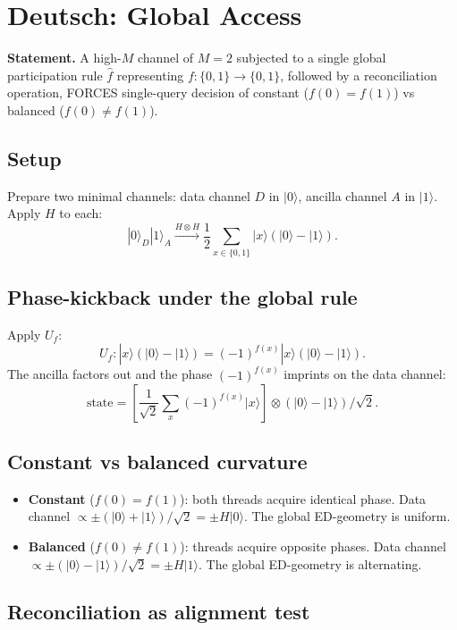 \documentclass[11pt,a4paper]{article}
\begin{document}
\section{Deutsch: Global Access}

\textbf{Statement.} A high-$M$ channel of $M = 2$ subjected to a single global participation rule $\hat f$ representing $f: \{0,1\} \to \{0,1\}$, followed by a reconciliation operation, FORCES single-query decision of constant ($f(0) = f(1)$) vs balanced ($f(0) \neq f(1)$).

\subsection{Setup}

Prepare two minimal channels: data channel $D$ in $|0\rangle$, ancilla channel $A$ in $|1\rangle$. Apply $H$ to each:
\[
|0\rangle_D |1\rangle_A \xrightarrow{H \otimes H} \frac{1}{2}\sum_{x \in \{0,1\}}|x\rangle(|0\rangle - |1\rangle).
\]

\subsection{Phase-kickback under the global rule}

Apply $U_f$:
\[
U_f: |x\rangle(|0\rangle - |1\rangle) = (-1)^{f(x)}|x\rangle(|0\rangle - |1\rangle).
\]
The ancilla factors out and the phase $(-1)^{f(x)}$ imprints on the data channel:
\[
\text{state} = \left[\frac{1}{\sqrt 2}\sum_x (-1)^{f(x)}|x\rangle\right] \otimes (|0\rangle - |1\rangle)/\sqrt{2}.
\]

\subsection{Constant vs balanced curvature}

\begin{itemize}[noitemsep]
  \item \textbf{Constant} ($f(0) = f(1)$): both threads acquire identical phase. Data channel $\propto \pm(|0\rangle + |1\rangle)/\sqrt{2} = \pm H|0\rangle$. The global ED-geometry is uniform.
  \item \textbf{Balanced} ($f(0) \neq f(1)$): threads acquire opposite phases. Data channel $\propto \pm(|0\rangle - |1\rangle)/\sqrt{2} = \pm H|1\rangle$. The global ED-geometry is alternating.
\end{itemize}

\subsection{Reconciliation as alignment test}
\end{document}
